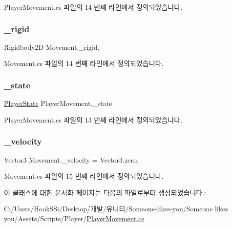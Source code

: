 Player\+Movement.\+cs 파일의 14 번째 라인에서 정의되었습니다.

\mbox{\label{class_movement_a8b24a93b5f529e53c668ff81bde13c0d}} 
\subsubsection{\texorpdfstring{\_rigid}{\_rigid}}
{\footnotesize\ttfamily Rigidbody2D Movement.\+\_\+rigid\hspace{0.3cm}{\ttfamily [protected]}, {\ttfamily [inherited]}}



Movement.\+cs 파일의 14 번째 라인에서 정의되었습니다.

\mbox{\label{class_player_movement_af88a64a22da9ba3a831b0fe31bd8e7db}} 
\subsubsection{\texorpdfstring{\_state}{\_state}}
{\footnotesize\ttfamily \mbox{\hyperlink{class_player_state}{Player\+State}} Player\+Movement.\+\_\+state\hspace{0.3cm}{\ttfamily [protected]}}



Player\+Movement.\+cs 파일의 13 번째 라인에서 정의되었습니다.

\mbox{\label{class_movement_a6ea6768262f1dca968be8ee5c14a0cc1}} 
\subsubsection{\texorpdfstring{\_velocity}{\_velocity}}
{\footnotesize\ttfamily Vector3 Movement.\+\_\+velocity = Vector3.\+zero\hspace{0.3cm}{\ttfamily [protected]}, {\ttfamily [inherited]}}



Movement.\+cs 파일의 15 번째 라인에서 정의되었습니다.



이 클래스에 대한 문서화 페이지는 다음의 파일로부터 생성되었습니다.\+:\begin{DoxyCompactItemize}
\item 
C\+:/\+Users/\+Hook\+S\+Si/\+Desktop/개발/유니티/\+Someone-\/likes-\/you/\+Someone likes you/\+Assets/\+Scripts/\+Player/\mbox{\hyperlink{_player_movement_8cs}{Player\+Movement.\+cs}}\end{DoxyCompactItemize}

